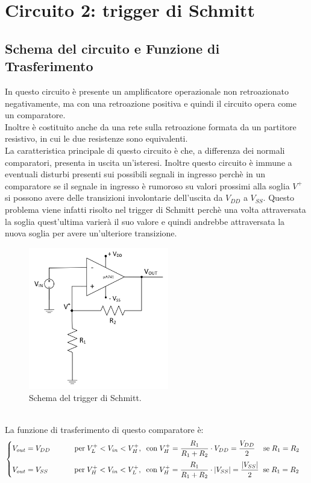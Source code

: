 \documentclass{report}
\begin{document}
\newpage
\section{Circuito 2: trigger di Schmitt}
\subsection{Schema del circuito e Funzione di Trasferimento}
In questo circuito è presente un amplificatore operazionale non retroazionato negativamente, ma con una retroazione positiva e quindi il circuito opera come un comparatore.
\\Inoltre è costituito anche da una rete sulla retroazione formata da un partitore resistivo, in cui le due resistenze sono equivalenti.
\\La caratteristica principale di questo circuito è che, a differenza dei normali comparatori, presenta in uscita un'isteresi. Inoltre questo circuito è immune a eventuali disturbi presenti sui possibili segnali in ingresso perchè in un comparatore se il segnale in ingresso è rumoroso su valori prossimi alla soglia ${V^+}$ si possono avere delle transizioni involontarie dell'uscita da ${V_{DD}}$ a ${V_{SS}}$. Questo problema viene infatti risolto nel trigger di Schmitt perchè una volta attraversata la soglia quest'ultima varierà il suo valore e quindi andrebbe attraversata la nuova soglia per avere un'ulteriore transizione.
\begin{figure}[h]
	\centering
	\includegraphics[height=6.2cm]{immagini/schema2}
	\caption{Schema del trigger di Schmitt.}
	\label{figura:schema2}
\end{figure}
\\ \noindent La funzione di trasferimento di questo comparatore è:
\begin{equation}
   \begin{cases} %
   V_{out}= V_{DD}\;\indent\indent \mathrm{per\;}  V_L^+<V_{in}<V_H^+\mathrm{, \;\; con\;}\displaystyle{ V_H^+=\frac{R_1}{R_1+R_2}\cdot V_{DD}=\frac{V_{DD}}{2}}\mathrm{\;\;\;\; se \;} R_1=R_2\\[10pt]
   V_{out}= V_{SS}\;\;\indent\indent \mathrm{per\;} V_H^+<V_{in}<V_L^+\mathrm{, \;\; con\;}\displaystyle{ V_H^+=\frac{R_1}{R_1+R_2}\cdot |V_{SS}|=\frac{|V_{SS}|}{2}}\mathrm{\;\; se \;} R_1=R_2\\
   \end{cases}
\end{equation}
\end{document}
